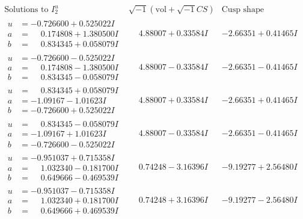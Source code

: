 \documentclass[1p]{elsarticle_modified}
\theoremstyle{definition}
\newcommand{\I}{\sqrt{-1}}
\begin{document}
$$\begin{array}{c|c|c}  
\text{Solutions to }I^u_{2}& \I (\text{vol} + \sqrt{-1}CS) & \text{Cusp shape}\\
 \hline 
\begin{aligned}
u &= -0.726600 + 0.525022 I \\
a &= \phantom{-}0.174808 + 1.380500 I \\
b &= \phantom{-}0.834345 + 0.058079 I\end{aligned}
 & \phantom{-}4.88007 + 0.33584 I & -2.66351 + 0.41465 I \\ \hline\begin{aligned}
u &= -0.726600 - 0.525022 I \\
a &= \phantom{-}0.174808 - 1.380500 I \\
b &= \phantom{-}0.834345 - 0.058079 I\end{aligned}
 & \phantom{-}4.88007 - 0.33584 I & -2.66351 - 0.41465 I \\ \hline\begin{aligned}
u &= \phantom{-}0.834345 + 0.058079 I \\
a &= -1.09167 - 1.01623 I \\
b &= -0.726600 + 0.525022 I\end{aligned}
 & \phantom{-}4.88007 + 0.33584 I & -2.66351 + 0.41465 I \\ \hline\begin{aligned}
u &= \phantom{-}0.834345 - 0.058079 I \\
a &= -1.09167 + 1.01623 I \\
b &= -0.726600 - 0.525022 I\end{aligned}
 & \phantom{-}4.88007 - 0.33584 I & -2.66351 - 0.41465 I \\ \hline\begin{aligned}
u &= -0.951037 + 0.715358 I \\
a &= \phantom{-}1.032340 - 0.181700 I \\
b &= \phantom{-}0.649666 - 0.469539 I\end{aligned}
 & \phantom{-}0.74248 - 3.16396 I & -9.19277 + 2.56480 I \\ \hline\begin{aligned}
u &= -0.951037 - 0.715358 I \\
a &= \phantom{-}1.032340 + 0.181700 I \\
b &= \phantom{-}0.649666 + 0.469539 I\end{aligned}
 & \phantom{-}0.74248 + 3.16396 I & -9.19277 - 2.56480 I \\ \hline\begin{aligned}

\end{aligned}
\end{array}$$
\end{document}
